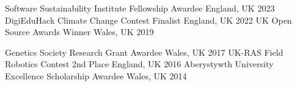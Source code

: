 


\begin{cvhonors}

  \cvhonor
    {Software Sustainability Institute Fellowship} %
    {Awardee} %
    {England, UK} %
    {2023} %
  \cvhonor
    {DigiEduHack Climate Change Contest} %
    {Finalist} %
    {England, UK} %
    {2022} %
    \cvhonor
    {UK Open Source Awards} %
    {Winner} %
    {Wales, UK} %
    {2019} %

  \cvhonor
    {Genetics Society Research Grant} %
    {Awardee} %
    {Wales, UK} %
    {2017} %
  \cvhonor
    {UK-RAS Field Robotics Contest} %
    {2nd Place} %
    {England, UK} %
    {2016} %
  \cvhonor
    {Aberystywth University Excellence Scholarship} %
    {Awardee} %
    {Wales, UK} %
    {2014} %
\end{cvhonors}